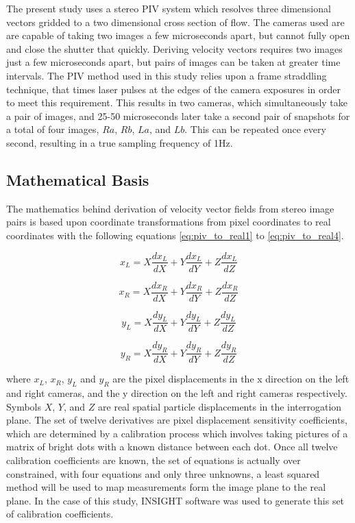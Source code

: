 The present study uses a stereo PIV system which resolves three dimensional 
vectors gridded to a two dimensional cross section of flow. The cameras used 
are  are capable of taking two images a few microseconds apart, 
but cannot fully open and close the shutter that quickly. Deriving velocity 
vectors requires two images just a few microseconds apart, but pairs of images 
can be taken at greater time intervals. The PIV method used in this study 
relies upon a frame straddling technique, that times laser pulses at the edges 
of the camera exposures in order to meet this requirement. This results in two 
cameras, which simultaneously take a pair of images, and 25-50 microseconds 
later take a second pair of snapshots for a total of four images, $Ra$, $Rb$, 
$La$, and $Lb$. This can be repeated once every second, resulting 
in a true sampling frequency of 1Hz.

\subsection{Mathematical Basis}

The mathematics behind derivation of velocity vector fields from stereo image 
pairs is based upon coordinate transformations from pixel coordinates to real 
coordinates with the following equations 
\ref{eq:piv_to_real1} to \ref{eq:piv_to_real4}.

\begin{equation}
	x_L= X\frac{dx_L}{dX} + Y\frac{dx_L}{dY} + Z\frac{dx_L}{dZ}
	\label{eq:piv_to_real1}
\end{equation}

\begin{equation}
	x_R= X\frac{dx_R}{dX} + Y\frac{dx_R}{dY} + Z\frac{dx_R}{dZ}
	\label{eq:piv_to_real2}
\end{equation}

\begin{equation}
	y_L= X\frac{dy_L}{dX} + Y\frac{dy_L}{dY} + Z\frac{dy_L}{dZ}
	\label{eq:piv_to_real3}
\end{equation}

\begin{equation}
	y_R= X\frac{dy_R}{dX} + Y\frac{dy_R}{dY} + Z\frac{dy_R}{dZ}
	\label{eq:piv_to_real4}
\end{equation}

where $x_L$, $x_R$, $y_L$ and $y_R$ are the pixel displacements in the x 
direction on the left and right cameras, and the y direction on the left and 
right cameras respectively. Symbols $X$, $Y$, and $Z$ are real spatial particle 
displacements in the interrogation plane. The set of twelve derivatives are 
pixel displacement sensitivity coefficients, which are determined by a 
calibration process which involves taking pictures of a matrix of bright dots 
with a known distance between each dot. Once all twelve calibration 
coefficients are known, the set of equations is actually over constrained, with 
four equations and only three unknowns, a least squared method will be used to 
map measurements form the image plane to the real plane. In the case of this 
study, INSIGHT software was used to generate this set of calibration 
coefficients.

